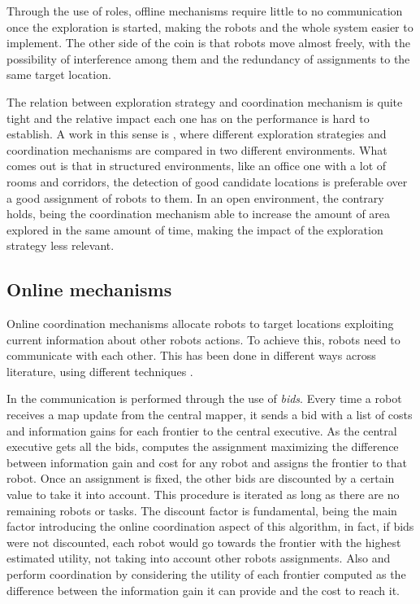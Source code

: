 Through the use of roles, offline mechanisms require little to no
communication once the exploration is started, making the robots and
the whole system easier to implement. The other side of the coin is
that robots move almost freely, with the possibility of interference
among them and the redundancy of assignments to the same target location.

The relation between exploration strategy and coordination mechanism
is quite tight and the relative impact each one has on the performance
is hard to establish. A work in this sense is \cite{Amigoni2013}, where different
exploration strategies and coordination mechanisms are compared in
two different environments. What comes out is that in structured environments,
like an office one with a lot of rooms and corridors, the detection
of good candidate locations is preferable over a good assignment of
robots to them. In an open environment, the contrary holds, being
the coordination mechanism able to increase the amount of area explored
in the same amount of time, making the impact of the exploration strategy
less relevant. 

\subsection{Online mechanisms}

Online coordination mechanisms allocate robots to target locations
exploiting current information about other robots actions. To achieve
this, robots need to communicate with each other. This has been done
in different ways across literature, using different techniques \cite{Simmons2000,Burgard,Burgard2005}. 

In \cite{Simmons2000} the communication is performed through the use of \emph{bids}.
Every time a robot receives a map update from the central mapper,
it sends a bid with a list of costs and information gains for each
frontier to the central executive. As the central executive gets all
the bids, computes the assignment maximizing the difference between
information gain and cost for any robot and assigns the frontier to
that robot. Once an assignment is fixed, the other bids are discounted
by a certain value to take it into account. This procedure is iterated
as long as there are no remaining robots or tasks. The discount factor
is fundamental, being the main factor introducing the online coordination
aspect of this algorithm, in fact, if bids were not discounted, each
robot would go towards the frontier with the highest estimated utility,
not taking into account other robots assignments. Also \cite{Burgard}
and \cite{Burgard2005} perform coordination by considering the utility of
each frontier computed as the difference between the information gain
it can provide and the cost to reach it. 

